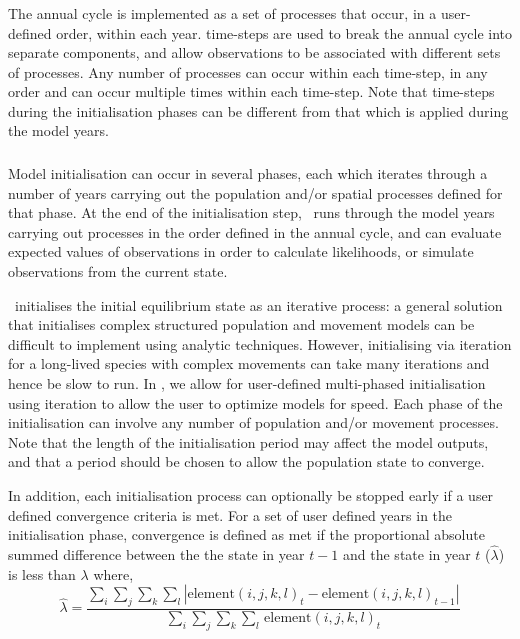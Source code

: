 \subsubsection{}

The annual cycle is implemented as a set of processes that occur, in a user-defined order, within each year. time-steps are used to break the annual cycle into separate components, and allow observations to be associated with different sets of processes. Any number of processes can occur within each time-step, in any order and can occur multiple times within each time-step. Note that time-steps during the initialisation phases can be different from that which is applied during the model years.

\subsubsection{}

Model initialisation can occur in several phases, each which iterates through a number of years carrying out the population and/or spatial processes defined for that phase. At the end of the initialisation step, \SPM\ runs through the model years carrying out processes in the order defined in the annual cycle, and can evaluate expected values of observations in order to calculate likelihoods, %
or simulate observations from the current state.

\SPM\ initialises the initial equilibrium state as an iterative process: a general solution that initialises complex structured population and movement models can be difficult to implement using analytic techniques. However, initialising via iteration for a long-lived species with complex movements can take many iterations and hence be slow to run. In \SPM, we allow for user-defined multi-phased initialisation using iteration to allow the user to optimize models for speed. Each phase of the initialisation can involve any number of population and/or movement processes. Note that the length of the initialisation period may affect the model outputs, and that a period should be chosen to allow the population state to converge.

In addition, each initialisation process can optionally be stopped early if a user defined convergence criteria is met. For a set of user defined years in the initialisation phase, convergence is defined as met if the proportional absolute summed difference between the the state in year $t-1$ and the state in year $t$ ($\widehat{\lambda}$) is less than $\lambda$ where, 
\begin{equation}
  \widehat{\lambda} = \frac{\sum\limits_{i} \sum\limits_{j} \sum\limits_{k} \sum\limits_l \left|\text{element}(i,j,k,l)_t - \text{element}(i,j,k,l)_{t-1} \right|}{\sum\limits_{i} \sum\limits_{j} \sum\limits_{k} \sum\limits_l \frac{}{}\text{element}(i,j,k,l)_t}
\end{equation}

